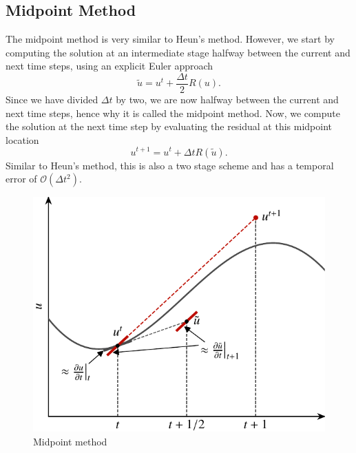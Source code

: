 \subsection{Midpoint Method}
The midpoint method is very similar to Heun's method. However, we start by computing the solution at an intermediate stage halfway between the current and next time steps, using an explicit Euler approach
\begin{equation}
	\tilde{u} = u^t + \frac{\Delta t}{2} R(u).
\end{equation}
Since we have divided $\Delta t$ by two, we are now halfway between the current and next time steps, hence why it is called the midpoint method. Now, we compute the solution at the next time step by evaluating the residual at this midpoint location
\begin{equation}
	u^{t+1} = u^t + \Delta t R(\tilde{u}).
\end{equation}
Similar to Heun's method, this is also a two stage scheme and has a temporal error of $\mathcal{O}(\Delta t^2)$.
\begin{figure}[htbp]
	\centering
	\includegraphics[width=0.6\linewidth]{Pictures/ch15_midpoint_method}
	\caption{Midpoint method}
	\label{fig:midpoint_method}
\end{figure}


